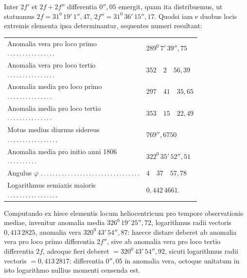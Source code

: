 Inter $2f'$ et $2f+2f''$ differentia $0''{,}05$ emergit, quam ita distribuemus, ut
statuamus $2f=31^0\,19'\,1''{,}47$, $2f''=31^0\,36'\,15''{,}17$. Quodsi iam e duobus locis
extremis elementa ipsa determinantur, sequentes numeri resultant:
\begin{center}\begingroup\footnotesize\setlength{\tabcolsep}{3pt}\renewcommand{\arraystretch}{1.3}
\begin{tabular}{ll}
\shortstack[l]{Anomalia vera pro loco primo\\.\,.\,.\,.\,.\,.\,.\,.\,.\,.\,.\,.\,.\,.\,.\,.} & $289^0\,7'\,39''{,}75$\\
\shortstack[l]{Anomalia vera pro loco tertio\\.\,.\,.\,.\,.\,.\,.\,.\,.\,.\,.\,.\,.\,.\,.\,.} & $352\quad2\quad56{,}39$\\
\shortstack[l]{Anomalia media pro loco primo\\.\,.\,.\,.\,.\,.\,.\,.\,.\,.\,.\,.\,.\,.\,.} & $297\quad41\quad35{,}65$\\
\shortstack[l]{Anomalia media pro loco tertio\\.\,.\,.\,.\,.\,.\,.\,.\,.\,.\,.\,.\,.\,.\,.} & $353\quad15\quad22{,}49$\\
\shortstack[l]{Motus medius diurnus sidereus\\.\,.\,.\,.\,.\,.\,.\,.\,.\,.\,.\,.\,.\,.\,.\,.\,.} & $769''{,}6750$\\
\shortstack[l]{Anomalia media pro initio anni 1806\\.\,.\,.\,.\,.\,.\,.\,.\,.\,.} & $322^0\,35'\,52''{,}51$\\
\shortstack[l]{Angulus $\varphi$\\.\,.\,.\,.\,.\,.\,.\,.\,.\,.\,.\,.\,.\,.\,.\,.\,.\,.\,.\,.\,.\,.\,.\,.\,.\,.\,.\,.\,.\,.\,.\,.\,.} & $4\quad37\quad57{,}78$\\
\shortstack[l]{Logarithmus semiaxis maioris\\.\,.\,.\,.\,.\,.\,.\,.\,.\,.\,.\,.\,.\,.\,.\,.\,.} & $0{,}442\,4661$.
\end{tabular}
\endgroup\end{center}

Computando ex hisce elementis locum heliocentricum pro tempore observationis mediae, invenitur anomalia media $326^0\,19'\,25''{,}72$, logarithmus radii
vectoris $0{,}413\,2825$, anomalia vera $320^0\,43'\,54''{,}87$: haecce distare deberet ab  anomalia vera pro loco primo differentia $2f''$, sive ab anomalia vera pro loco
tertio differentia $2f$, adeoque fieri deberet $=320^{0}\,43'\,54''{,}92$, sicuti
logarithmus radii vectoris $=0{,}413\,2817$: differentia $0''{,}05$ in anomalia vera,
octoque unitatum in isto logarithmo nullius momenti censenda est.

